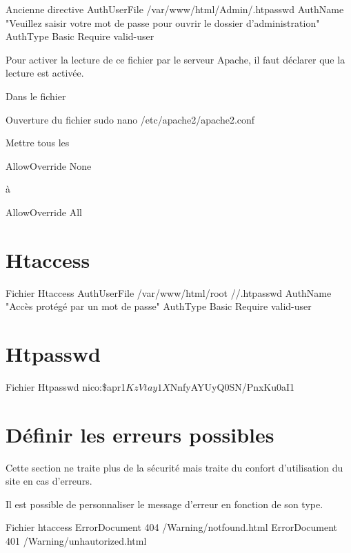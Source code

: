\begin{Bash}{Ancienne directive}
AuthUserFile /var/www/html/Admin/.htpasswd
AuthName "Veuillez saisir votre mot de passe pour ouvrir le dossier d'administration"
AuthType Basic
Require valid-user
\end{Bash}

Pour activer la lecture de ce fichier par le serveur Apache, il faut déclarer que la lecture est activée.

Dans le fichier 
\begin{Bash}{Ouverture du fichier}
sudo nano /etc/apache2/apache2.conf
\end{Bash}

Mettre tous les 
\begin{Bash}{\protect }
AllowOverride None
\end{Bash}
à 
\begin{Bash}{\protect }
AllowOverride All
\end{Bash}


\section{Htaccess}

\begin{Bash}{Fichier Htaccess}
AuthUserFile /var/www/html/root	//.htpasswd
AuthName "Accès protégé par un mot de passe"
AuthType Basic
Require valid-user
\end{Bash}

\section{Htpasswd}
\begin{Bash}{Fichier Htpasswd}
nico:\$apr1$KzVtay1X$NnfyAYUyQ0SN/PnxKu0aI1

\end{Bash}

\section{Définir les erreurs possibles}

Cette section ne traite plus de la sécurité mais traite du confort d’utilisation du site en cas d’erreurs.

Il est possible de personnaliser le message d’erreur en fonction de son type.

\begin{Bash}{Fichier htaccess}
ErrorDocument 404 /Warning/notfound.html
ErrorDocument 401 /Warning/unhautorized.html
\end{Bash}


